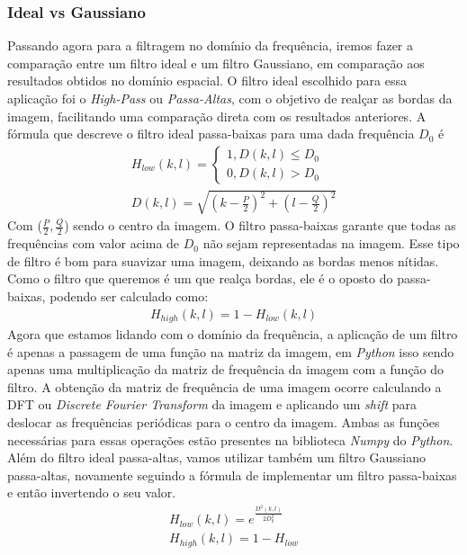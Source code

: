 \documentclass[conference]{IEEEtran}
\begin{document}
\subsubsection[Ideal_vs]{Ideal vs Gaussiano}
Passando agora para a filtragem no domínio da frequência, iremos fazer a comparação entre um filtro ideal e um filtro Gaussiano, em comparação aos resultados obtidos no domínio espacial.
O filtro ideal escolhido para essa aplicação foi o \textit{High-Pass} ou \textit{Passa-Altas}, com o objetivo de realçar as bordas da imagem, facilitando uma comparação direta com os resultados anteriores.
A fórmula que descreve o filtro ideal passa-baixas para uma dada frequência $D_0$ é
\begin{align}
    H_{low}(k,l) = \begin{cases}
        1, D(k,l) \leq D_0\\
        0, D(k,l) > D_0
    \end{cases}\\
    D(k,l) = \sqrt{(k-\frac{P}{2})^2 + (l-\frac{Q}{2})^2}
\end{align}
Com ($\frac{P}{2},\frac{Q}{2}$) sendo o centro da imagem. O filtro passa-baixas garante que todas as frequências com valor acima de $D_0$ não sejam representadas na imagem.
Esse tipo de filtro é bom para suavizar uma imagem, deixando as bordas menos nítidas. 
Como o filtro que queremos é um que realça bordas, ele é o oposto do passa-baixas, podendo ser calculado como:
\begin{align}
    H_{high}(k,l) = 1 - H_{low}(k,l)
\end{align}
Agora que estamos lidando com o domínio da frequência, a aplicação de um filtro é apenas a passagem de uma função na matriz da imagem, 
em \textit{Python} isso sendo apenas uma multiplicação da matriz de frequência da imagem com a função do filtro.
A obtenção da matriz de frequência de uma imagem ocorre calculando a DFT ou \textit{Discrete Fourier Transform} da imagem e 
aplicando um \textit{shift} para deslocar as frequências periódicas para o centro da imagem. 
Ambas as funções necessárias para essas operações estão presentes na biblioteca \textit{Numpy} do \textit{Python}.
Além do filtro ideal passa-altas, vamos utilizar também um filtro Gaussiano passa-altas, novamente seguindo a fórmula de implementar um filtro passa-baixas e então invertendo o seu valor.
\begin{align}
    H_{low}(k,l) = e^\frac{D^2(k,l)}{2D^2_0}\\
    H_{high}(k,l) = 1 - H_{low}
\end{align}
\end{document}
